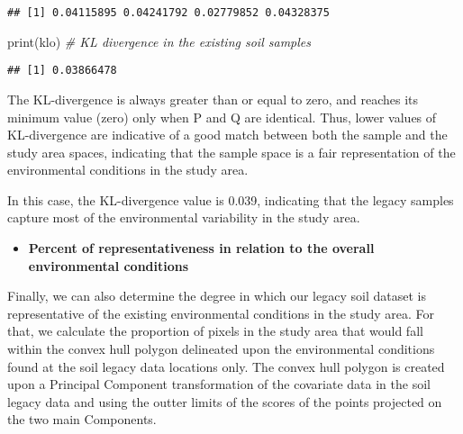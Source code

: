 \documentclass[
]{book}
\newenvironment{Shaded}{\begin{snugshade}}{\end{snugshade}}
\newcommand{\CommentTok}[1]{\textcolor[rgb]{0.56,0.35,0.01}{\textit{#1}}}
\newcommand{\FunctionTok}[1]{\textcolor[rgb]{0.00,0.00,0.00}{#1}}
\newcommand{\NormalTok}[1]{#1}
\providecommand{\tightlist}{%
  \setlength{\itemsep}{0pt}\setlength{\parskip}{0pt}}
\begin{document}
\begin{verbatim}
## [1] 0.04115895 0.04241792 0.02779852 0.04328375
\end{verbatim}

\begin{Shaded}
\begin{Highlighting}[]
    \FunctionTok{print}\NormalTok{(klo) }\CommentTok{\# KL divergence in the existing soil samples}
\end{Highlighting}
\end{Shaded}

\begin{verbatim}
## [1] 0.03866478
\end{verbatim}

The KL-divergence is always greater than or equal to zero, and reaches its minimum value (zero) only when P and Q are identical. Thus, lower values of KL-divergence are indicative of a good match between both the sample and the study area spaces, indicating that the sample space is a fair representation of the environmental conditions in the study area.

In this case, the KL-divergence value is 0.039, indicating that the legacy samples capture most of the environmental variability in the study area.

\begin{itemize}
\tightlist
\item
  \textbf{Percent of representativeness in relation to the overall environmental conditions}
\end{itemize}

Finally, we can also determine the degree in which our legacy soil dataset is representative of the existing environmental conditions in the study area. For that, we calculate the proportion of pixels in the study area that would fall within the convex hull polygon delineated upon the environmental conditions found at the soil legacy data locations only. The convex hull polygon is created upon a Principal Component transformation of the covariate data in the soil legacy data and using the outter limits of the scores of the points projected on the two main Components.
\end{document}
